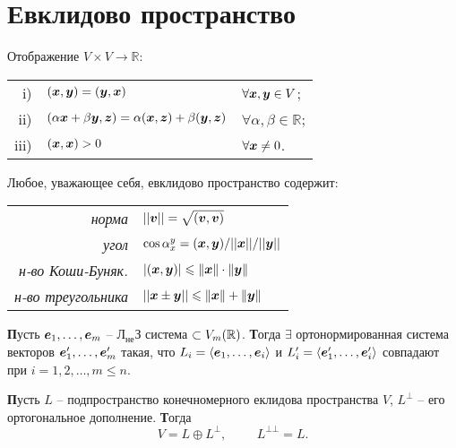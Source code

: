 \section{Евклидово пространство}

\begin{to_def}
    Отображение $V \times V \to \mathbb{R}$:\\
      \begin{tabular}{rll}
       i) & $(\mbox{\boldmath $x$}, \mbox{\boldmath $y$}) = (\mbox{\boldmath $y$}, \mbox{\boldmath $x$})$ & $\forall \mbox{\boldmath $x$}, \mbox{\boldmath $y$} \in V$; \\
       ii) & $(\alpha \mbox{\boldmath $x$} + \beta \mbox{\boldmath $y$}, \mbox{\boldmath $z$}) = \alpha (\mbox{\boldmath $x$}, \mbox{\boldmath $z$}) + \beta (\mbox{\boldmath $y$}, \mbox{\boldmath $z$})$ & $\forall \alpha, \beta \in \mathbb{R}$; \\
       iii) & $(\mbox{\boldmath $x$}, \mbox{\boldmath $x$}) > 0$ & $\forall \mbox{\boldmath $x$} \neq 0$. \\
        \end{tabular}
\end{to_def}


\noindent
Любое, уважающее себя, евклидово пространство содержит:\\
\begin{tabular}{rl}
    \textit{норма }              & $||\mbox{\boldmath $v$}|| = \sqrt{(\mbox{\boldmath $v$}, \mbox{\boldmath $v$})}$ \\
    \textit{угол }               & $\cos \alpha_{{x}}^{{y}} = (\mbox{\boldmath $x$}, \mbox{\boldmath $y$}) / ||\mbox{\boldmath $x$}|| / ||\mbox{\boldmath $y$}||$ \\
    \textit{н-во Коши-Буняк.}    & $|(\mbox{\boldmath $x$}, \mbox{\boldmath $y$})| \leqslant \|\mbox{\boldmath $x$}\| \cdot \|\mbox{\boldmath $y$}\|$\\
    \textit{н-во треугольника}   & $||{\mbox{\boldmath $x$} \pm \mbox{\boldmath $y$}}|| \leqslant \|\mbox{\boldmath $x$}\| + \|\mbox{\boldmath $y$}\|$\\
\end{tabular}

\begin{to_thr}
\textbf{П}усть $\mbox{\boldmath $e$}_1, \dots, \mbox{\boldmath $e$}_m$ --  Л$_\text{не}$З система $\subset V_{m}(\mathbb{R})$. \textbf{Т}огда $\exists$ ортонормированная система векторов $\mbox{\boldmath $e$}_1', \dots, \mbox{\boldmath $e$}_m'$ такая, что $L_i = \langle \mbox{\boldmath $e$}_1, \dots, \mbox{\boldmath $e$}_i \rangle$ и $L_i' = \langle \mbox{\boldmath $e$}_1', \dots, \mbox{\boldmath $e$}_i' \rangle$ совпадают при $i = 1,2, \dots, m \leqslant n$.
\end{to_thr}
  
\begin{to_thr}
    \textbf{П}усть $L$ -- подпространство конечномерного еклидова пространства $V$, $L^{\bot}$ -- его ортогональное дополнение. \textbf{Т}огда 
    \begin{equation}
        V = L \oplus L^{\bot}, \hspace{1cm} L^{\bot \bot} = L.
    \end{equation}
\end{to_thr}

